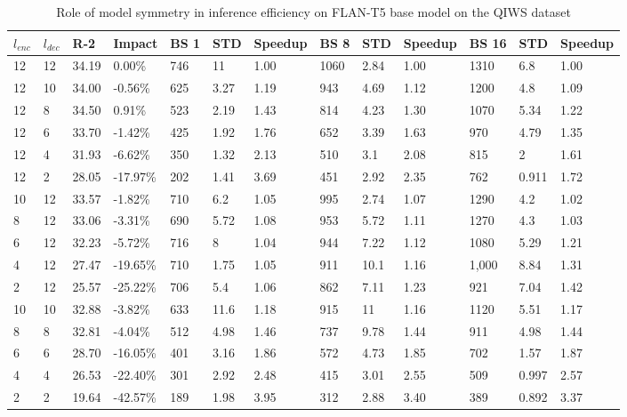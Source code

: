 \begin{table*}[!ht]
    \centering
    \caption{Role of model symmetry in inference efficiency on FLAN-T5 base model on the QIWS dataset}
    \small
    \begin{tabular}{|l|l|l|l|l|l|l|l|l|l|l|l|l|}
    \hline
         $l_{enc}$ & $l_{dec}$ & R-2 & Impact & BS 1 & STD & Speedup & BS 8 & STD  & Speedup & BS 16 & STD & Speedup \\ \hline
         12 & 12 & 34.19 & 0.00\% & 746 & 11 & 1.00 & 1060 & 2.84 & 1.00 & 1310 & 6.8 & 1.00 \\ \hline
        12 & 10 & 34.00 & -0.56\% & 625 & 3.27 & 1.19 & 943 & 4.69 & 1.12 & 1200 & 4.8 & 1.09 \\ \hline
        12 & 8 & 34.50 & 0.91\% & 523 & 2.19 & 1.43 & 814 & 4.23 & 1.30 & 1070 & 5.34 & 1.22 \\ \hline
        12 & 6 & 33.70 & -1.42\% & 425 & 1.92 & 1.76 & 652 & 3.39 & 1.63 & 970 & 4.79 & 1.35 \\ \hline
        12 & 4 & 31.93 & -6.62\% & 350 & 1.32 & 2.13 & 510 & 3.1 & 2.08 & 815 & 2 & 1.61 \\ \hline
        12 & 2 & 28.05 & -17.97\% & 202 & 1.41 & 3.69 & 451 & 2.92 & 2.35 & 762 & 0.911 & 1.72 \\ \hline
        10 & 12 & 33.57 & -1.82\% & 710 & 6.2 & 1.05 & 995 & 2.74 & 1.07 & 1290 & 4.2 & 1.02 \\ \hline
        8 & 12 & 33.06 & -3.31\% & 690 & 5.72 & 1.08 & 953 & 5.72 & 1.11 & 1270 & 4.3 & 1.03 \\ \hline
        6 & 12 & 32.23 & -5.72\% & 716 & 8 & 1.04 & 944 & 7.22 & 1.12 & 1080 & 5.29 & 1.21 \\ \hline
        4 & 12 & 27.47 & -19.65\% & 710 & 1.75 & 1.05 & 911 & 10.1 & 1.16 & 1,000 & 8.84 & 1.31 \\ \hline
        2 & 12 & 25.57 & -25.22\% & 706 & 5.4 & 1.06 & 862 & 7.11 & 1.23 & 921 & 7.04 & 1.42 \\ \hline
        10 & 10 & 32.88 & -3.82\% & 633 & 11.6 & 1.18 & 915 & 11 & 1.16 & 1120 & 5.51 & 1.17 \\ \hline
        8 & 8 & 32.81 & -4.04\% & 512 & 4.98 & 1.46 & 737 & 9.78 & 1.44 & 911 & 4.98 & 1.44 \\ \hline
        6 & 6 & 28.70 & -16.05\% & 401 & 3.16 & 1.86 & 572 & 4.73 & 1.85 & 702 & 1.57 & 1.87 \\ \hline
        4 & 4 & 26.53 & -22.40\% & 301 & 2.92 & 2.48 & 415 & 3.01 & 2.55 & 509 & 0.997 & 2.57 \\ \hline
        2 & 2 & 19.64 & -42.57\% & 189 & 1.98 & 3.95 & 312 & 2.88 & 3.40 & 389 & 0.892 & 3.37 \\ \hline
    \end{tabular}
    \label{tab:qiws-asym-inference-base}
\end{table*}
